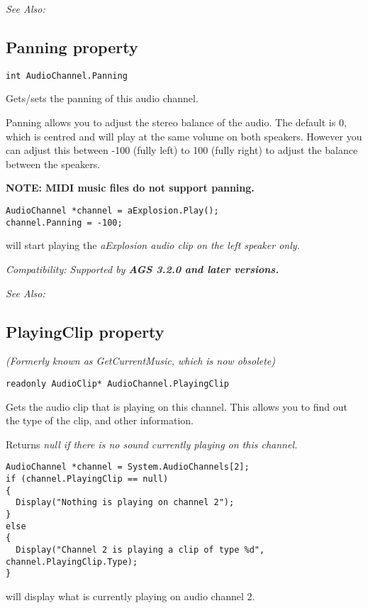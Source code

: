 \it{See Also:} 


\subsection{Panning property}\label{AudioChannel.Panning}%

\begin{verbatim}
int AudioChannel.Panning
\end{verbatim}
Gets/sets the panning of this audio channel.

Panning allows you to adjust the stereo balance of the audio. The default is 0, which is
centred and will play at the same volume on both speakers. However you can adjust this
between -100 (fully left) to 100 (fully right) to adjust the balance between the speakers.

\bf{NOTE:} MIDI music files do not support panning.

\begin{verbatim}
AudioChannel *channel = aExplosion.Play();
channel.Panning = -100;
\end{verbatim}
will start playing the \it{aExplosion} audio clip on the left speaker only.

\it{Compatibility:} Supported by \bf{AGS 3.2.0} and later versions.

\it{See Also:} 


\subsection{PlayingClip property}\label{AudioChannel.PlayingClip}%

\it{(Formerly known as GetCurrentMusic, which is now obsolete)}

\begin{verbatim}
readonly AudioClip* AudioChannel.PlayingClip
\end{verbatim}
Gets the audio clip that is playing on this channel. This allows you to find out the type
of the clip, and other information.

Returns \it{null} if there is no sound currently playing on this channel.

\begin{verbatim}
AudioChannel *channel = System.AudioChannels[2];
if (channel.PlayingClip == null)
{
  Display("Nothing is playing on channel 2");
}
else
{
  Display("Channel 2 is playing a clip of type %d", channel.PlayingClip.Type);
}
\end{verbatim}
will display what is currently playing on audio channel 2.

